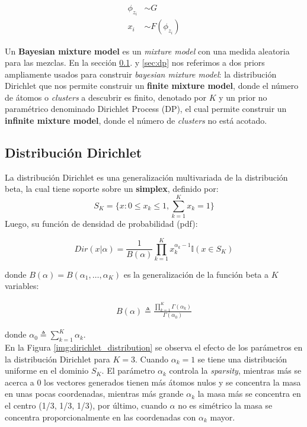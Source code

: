 \documentclass[letterpaper,12pt,oneside]{book} %
\begin{document}
\begin{align}
\phi_{z_{i}} & \sim G\\
x_{i} & \sim  F(\phi_{z_{i}})
\end{align}

Un \textbf{Bayesian mixture model} es un \textit{mixture model} con una medida aleatoria para las mezclas. En la sección \ref{sec:dirichlet}. y \ref{sec:dp} nos referimos a dos priors ampliamente usados para construir \textit{bayesian mixture model}: la distribución Dirichlet que nos permite construir un \textbf{finite mixture model}, donde el número de átomos o \textit{clusters} a descubrir es finito, denotado por $K$ y un prior no paramétrico denominado Dirichlet Process (DP), el cual permite construir un \textbf{infinite mixture model}, donde el número de \textit{clusters} no está acotado. 

\subsection{Distribución Dirichlet}
\label{sec:dirichlet}

La distribución Dirichlet \citep{minka2000estimating} es una generalización multivariada de la distribución beta, la cual tiene soporte sobre un \textbf{simplex}, definido por:
\begin{equation}
    S_{K} = \{x: 0\leq x_{k} \leq 1, \sum_{k=1}^{K}x_{k}=1\}
\end{equation}
Luego, su función de densidad de probabilidad (pdf):

\begin{equation}
    Dir(x|\alpha)=\frac{1}{B(\alpha)}\prod_{k=1}^{K}x_{k}^{\alpha_{k}-1}\mathbb{I}(x\in S_{K})
\end{equation}

donde $B(\alpha) = B(\alpha_{1}, \ldots, \alpha_{K})$ es la generalización de la función beta a $K$ variables:

\begin{align}
    B(\alpha) \triangleq \frac{\prod_{k=1}^{K}\Gamma(\alpha_{k})}{\Gamma(\alpha_{0})}
\end{align}

donde $\alpha_{0} \triangleq \sum_{k=1}^{K}\alpha_{k}$.\\

En la Figura \ref{img:dirichlet_distribution} se observa el efecto de los parámetros en la distribución Dirichlet para $K=3$. Cuando $\alpha_{k}=1$ se tiene una distribución uniforme en el dominio $S_{K}$. El parámetro $\alpha_{k}$ controla la \textit{sparsity}, mientras más se acerca a 0 los vectores generados tienen más átomos nulos y se concentra la masa en unas pocas coordenadas, mientras más grande $\alpha_{k}$ la masa más se concentra en el centro (1/3, 1/3, 1/3), por último, cuando $\alpha$ no es simétrico la masa se concentra proporcionalmente en las coordenadas con $\alpha_{k}$ mayor.\\
\end{document}
